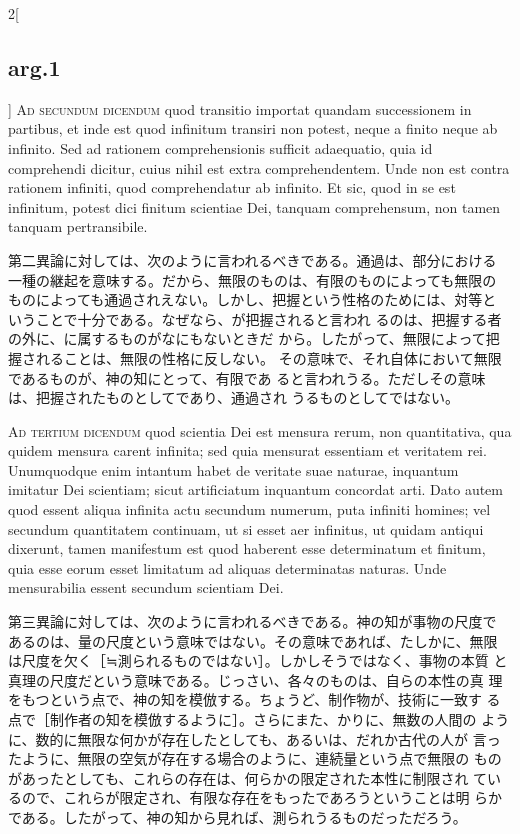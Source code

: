 \documentclass[paper=a4paper,fontsize=10pt,jafontsize=9pt,titlepage]{jlreq}
\begin{document}
\begin{paracol}{2}[\subsection{arg.1}]
{\scshape Ad secundum dicendum} quod transitio importat quandam
successionem in partibus, et inde est quod infinitum transiri non
potest, neque a finito neque ab infinito. Sed ad rationem
comprehensionis sufficit adaequatio, quia id comprehendi dicitur,
cuius nihil est extra comprehendentem. Unde non est contra rationem
infiniti, quod comprehendatur ab infinito. Et sic, quod in se est
infinitum, potest dici finitum scientiae Dei, tanquam comprehensum,
non tamen tanquam pertransibile.

\switchcolumn

第二異論に対しては、次のように言われるべきである。通過は、部分における
一種の継起を意味する。だから、無限のものは、有限のものによっても無限の
ものによっても通過されえない。しかし、把握という性格のためには、対等と
いうことで十分である。なぜなら、が把握されると言われ
るのは、把握する者の外に、に属するものがなにもないときだ
から。したがって、無限によって把握されることは、無限の性格に反しない。
その意味で、それ自体において無限であるものが、神の知にとって、有限であ
ると言われうる。ただしその意味は、把握されたものとしてであり、通過され
うるものとしてではない。

\switchcolumn*[\subsection{ad.3}]

{\scshape Ad tertium dicendum} quod scientia Dei est mensura rerum,
non quantitativa, qua quidem mensura carent infinita; sed quia
mensurat essentiam et veritatem rei. Unumquodque enim intantum habet
de veritate suae naturae, inquantum imitatur Dei scientiam; sicut
artificiatum inquantum concordat arti. Dato autem quod essent aliqua
infinita actu secundum numerum, puta infiniti homines; vel secundum
quantitatem continuam, ut si esset aer infinitus, ut quidam antiqui
dixerunt, tamen manifestum est quod haberent esse determinatum et
finitum, quia esse eorum esset limitatum ad aliquas determinatas
naturas. Unde mensurabilia essent secundum scientiam Dei.

\switchcolumn

第三異論に対しては、次のように言われるべきである。神の知が事物の尺度で
あるのは、量の尺度という意味ではない。その意味であれば、たしかに、無限
は尺度を欠く［≒測られるものではない］。しかしそうではなく、事物の本質
と真理の尺度だという意味である。じっさい、各々のものは、自らの本性の真
理をもつという点で、神の知を模倣する。ちょうど、制作物が、技術に一致す
る点で［制作者の知を模倣するように］。さらにまた、かりに、無数の人間の
ように、数的に無限な何かが存在したとしても、あるいは、だれか古代の人が
言ったように、無限の空気が存在する場合のように、連続量という点で無限の
ものがあったとしても、これらの存在は、何らかの限定された本性に制限され
ているので、これらが限定され、有限な存在をもったであろうということは明
らかである。したがって、神の知から見れば、測られうるものだっただろう。

\end{paracol}
\end{document}
